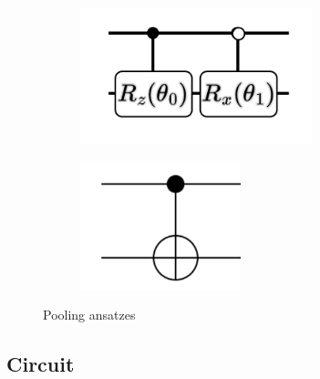 \documentclass[
  13pt,
  a4paper,
  DIV=11,
  numbers=noendperiod]{scrreprt}
\begin{document}
\begin{figure}

\begin{minipage}{0.50\linewidth}

\begin{figure}[H]

{\centering \includegraphics[width=\textwidth,height=1.5625in]{chapters/../img/ansatz_pool.png}

}


\end{figure}%

\end{minipage}%
%
\begin{minipage}{0.50\linewidth}

\begin{figure}[H]

{\centering \includegraphics[width=\textwidth,height=1.45833in]{chapters/../img/ansatz_pool_simpler.png}

}


\end{figure}%

\end{minipage}%

\caption{\label{fig-pool-ansatz}Pooling ansatzes}

\end{figure}%

\subsection{Circuit}\label{circuit}
\end{document}
